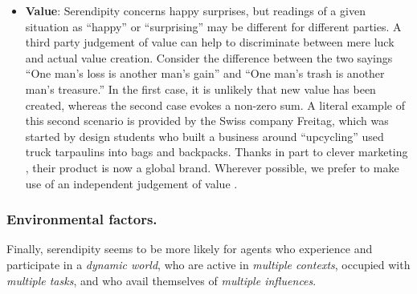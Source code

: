 
\begin{itemize}
\item \textbf{Value}: Serendipity concerns happy surprises, but
  readings of a given situation as ``happy'' or ``surprising'' may be
  different for different parties.  A third party judgement of value
  can help to discriminate between mere luck and actual value
  creation.  Consider the difference between the two sayings ``One
  man's loss is another man's gain'' and ``One man's trash is another
  man's treasure.''  In the first case, it is unlikely that new value
  has been created, whereas the second case evokes a non-zero sum.
  A literal example of this second scenario is provided by the
  Swiss company Freitag, which was started by design students who
  built a business around ``upcycling'' used truck tarpaulins into
  bags and backpacks.  Thanks in part to clever marketing
  \cite[pp. 54--55, 68--69,]{russo2010companies}, their product is now
  a global brand.  Wherever possible, we prefer to make use of an
  independent judgement of value \cite{jordanous:12}.
\end{itemize}

\subsubsection*{Environmental factors.}

Finally, serendipity seems to be more likely for agents who experience and participate in a \emph{dynamic world}, who are active in \emph{multiple contexts}, occupied with \emph{multiple tasks}, and who avail themselves of \emph{multiple influences}.

